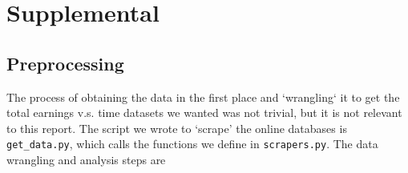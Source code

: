 \documentclass[12pt]{article}
\begin{document}
\appendix
\section{Supplemental}

\subsection{Preprocessing}
The process of obtaining the data in the first place and `wrangling` it to get the total earnings v.s. time datasets we wanted was not trivial, but it is not relevant to this report.  The script we wrote to `scrape' the online databases is \texttt{get\_data.py}, which calls the functions we define in \texttt{scrapers.py}.  The data wrangling and analysis steps are
\end{document}
